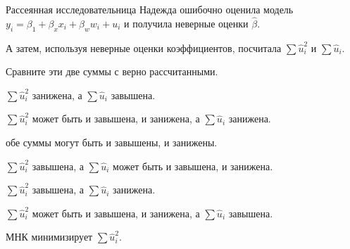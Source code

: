 
\begin{question}
Рассеянная исследовательница Надежда ошибочно оценила модель \(y_i = \beta_1 + \beta_x x_i + \beta_w w_i + u_i\) и получила неверные оценки \(\hat \beta\).

А затем, используя неверные оценки коэффициентов, посчитала \(\sum \hat u_i^2\) и \(\sum \hat u_i\).

Сравните эти две суммы с верно рассчитанными.
\begin{answerlist}
  \item \(\sum \hat u_i^2\) занижена, а \(\sum \hat u_i\) завышена.
  \item \(\sum \hat u_i^2\) может быть и завышена, и занижена, а \(\sum \hat u_i\) занижена.
  \item обе суммы могут быть и завышены, и занижены.
  \item \(\sum \hat u_i^2\) завышена, а \(\sum \hat u_i\) может быть и завышена, и занижена.
  \item \(\sum \hat u_i^2\) завышена, а \(\sum \hat u_i\) занижена.
  \item \(\sum \hat u_i^2\) может быть и завышена, и занижена, а \(\sum \hat u_i\) завышена.
\end{answerlist}
\end{question}

\begin{solution}
МНК минимизирует \(\sum \hat u_i^2\).
\end{solution}


